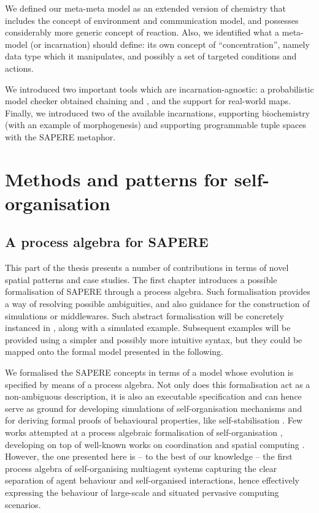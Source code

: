 \documentclass[12pt,a4paper,twoside,openright]{book}
\begin{document}
We defined our meta-meta model as an extended version of chemistry that includes the concept of environment and communication model, and possesses considerably more generic concept of reaction.
%
Also, we identified what a meta-model (or incarnation) should define: its own concept of ``concentration'', namely data type which it manipulates, and possibly a set of targeted conditions and actions.

We introduced two important tools which are incarnation-agnostic: a probabilistic model checker obtained chaining \alchemist{} and \multivesta{}, and the support for real-world maps.
%
Finally, we introduced two of the available incarnations, supporting biochemistry (with an example of morphogenesis) and supporting programmable tuple spaces with the SAPERE metaphor.

\part{Methods and patterns for self-organisation}
\label{contribution-pattern}
\chapter{A process algebra for SAPERE}
\label{sapere-process-algebra}
This part of the thesis presents a number of contributions in terms of novel spatial patterns and case studies.
%
The first chapter introduces a possible formalisation of SAPERE through a process algebra.
%
Such formalisation provides a way of resolving possible ambiguities, and also guidance for the construction of simulations or middlewares.
%
Such abstract formalisation will be concretely instanced in , along with a simulated example.
%
Subsequent examples will be provided using a simpler and possibly more intuitive syntax, but they could be mapped onto the formal model presented in the following.

We formalised the SAPERE concepts in terms of a model whose evolution is specified by means of a process algebra.
%
Not only does this formalisation act as a non-ambiguous description, it is also an executable specification and can hence serve as ground for developing simulations of self-organisation mechanisms and for deriving formal proofs of behavioural properties, like self-stabilisation \cite{V-SCW2013}.
%
Few works attempted at a process algebraic formalisation of self-organisation \cite{VPB-COORD2012,VDB-FOCLASA-CIC2013}, developing on top of well-known works on coordination and spatial computing \cite{zavattaro2,proto}.
%
However, the one presented here is -- to the best of our knowledge -- the first process algebra of self-organising multiagent systems capturing the clear separation of agent behaviour and self-organised interactions, hence effectively expressing the behaviour of large-scale and situated pervasive computing scenarios.
\end{document}
